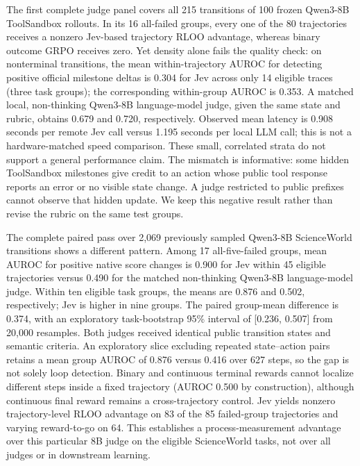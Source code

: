 \documentclass{article}
\begin{document}
The first complete judge panel covers all 215 transitions of 100 frozen Qwen3-8B ToolSandbox rollouts. In its 16 all-failed groups, every one of the 80 trajectories receives a nonzero Jev-based trajectory RLOO advantage, whereas binary outcome GRPO receives zero. Yet density alone fails the quality check: on nonterminal transitions, the mean within-trajectory AUROC for detecting positive official milestone deltas is 0.304 for Jev across only 14 eligible traces (three task groups); the corresponding within-group AUROC is 0.353. A matched local, non-thinking Qwen3-8B language-model judge, given the same state and rubric, obtains 0.679 and 0.720, respectively. Observed mean latency is 0.908 seconds per remote Jev call versus 1.195 seconds per local LLM call; this is not a hardware-matched speed comparison. These small, correlated strata do not support a general performance claim. The mismatch is informative: some hidden ToolSandbox milestones give credit to an action whose public tool response reports an error or no visible state change. A judge restricted to public prefixes cannot observe that hidden update. We keep this negative result rather than revise the rubric on the same test groups.

The complete paired pass over 2,069 previously sampled Qwen3-8B ScienceWorld transitions shows a different pattern. Among 17 all-five-failed groups, mean AUROC for positive native score changes is 0.900 for Jev within 45 eligible trajectories versus 0.490 for the matched non-thinking Qwen3-8B language-model judge. Within ten eligible task groups, the means are 0.876 and 0.502, respectively; Jev is higher in nine groups. The paired group-mean difference is 0.374, with an exploratory task-bootstrap 95\% interval of [0.236, 0.507] from 20,000 resamples. Both judges received identical public transition states and semantic criteria. An exploratory slice excluding repeated state--action pairs retains a mean group AUROC of 0.876 versus 0.416 over 627 steps, so the gap is not solely loop detection. Binary and continuous terminal rewards cannot localize different steps inside a fixed trajectory (AUROC 0.500 by construction), although continuous final reward remains a cross-trajectory control. Jev yields nonzero trajectory-level RLOO advantage on 83 of the 85 failed-group trajectories and varying reward-to-go on 64. This establishes a process-measurement advantage over this particular 8B judge on the eligible ScienceWorld tasks, not over all judges or in downstream learning.
\end{document}

